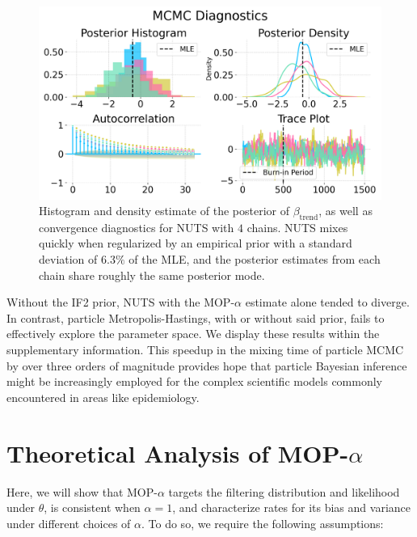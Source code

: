 \documentclass[numsec,webpdf,modern,medium,namedate]{oup-authoring-template}
\newcommand\arxiv[2]{#2} %
\theoremstyle{thmstyleone}%
\theoremstyle{thmstyletwo}%
\theoremstyle{thmstylethree}%
\begin{document}
\begin{figure}[t!]
    \centering
    \includegraphics[width=\arxiv{\textwidth/\real{1.25}}{\textwidth}]{imgs/pmcmc/nuts_eb.png}
    \arxiv{}{\vspace*{-1mm}}
    \caption{Histogram and density estimate of the posterior of $\beta_{\text{trend}}$, as well as convergence diagnostics for NUTS with $4$ chains. NUTS mixes quickly when regularized by an empirical prior with a standard deviation of $6.3\%$ of the MLE, and the posterior estimates from each chain share roughly the same posterior mode.}
    \label{fig:nuts-eb}
    \arxiv{}{\vspace*{-4mm}}
\end{figure}

Without the IF2 prior, NUTS with the MOP-$\alpha$ estimate alone tended to diverge.
In contrast, particle Metropolis-Hastings, with or without said prior, fails to effectively explore the parameter space.
We display these results \arxiv{in Figures \ref{fig:mh} and \ref{fig:nuts} in Appendix~\ref{appendix:bayes}}{within the supplementary information}. 
This speedup in the mixing time of particle MCMC by over three orders of magnitude provides hope that particle Bayesian inference might be increasingly employed for the complex scientific models commonly encountered in areas like epidemiology.

\arxiv{}{\vspace*{-2mm}}
\section{Theoretical Analysis of MOP-$\alpha$}
\label{sec:thms}

Here, we will show that MOP-$\alpha$ targets the filtering distribution and likelihood under $\theta$, is consistent when $\alpha=1$, and characterize rates for its bias and variance under different choices of $\alpha$. To do so, we require the following assumptions:
\end{document}
